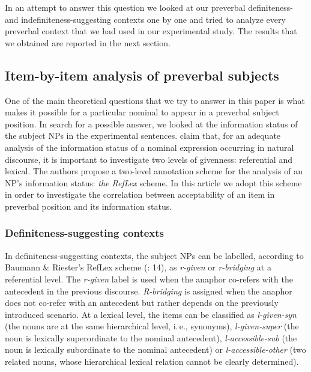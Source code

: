 \documentclass[output=paper]{langsci/langscibook}
\begin{document}
In an attempt to answer this question we looked at our preverbal definite\-ness- and indefiniteness-suggesting contexts one by one and tried to analyze every preverbal context that we had used in our experimental study. The results that we obtained are reported in the next section.

\subsection{Item-by-item analysis of preverbal subjects}\label{2sec:34}

One of the main theoretical questions that we try to answer in this paper is what makes it possible for a particular nominal to appear in a preverbal subject position. In search for a possible answer, we looked at the information status of the subject NPs in the experimental sentences. \cite{baumann:riester:12} claim that, for an adequate analysis of the information status of a nominal expression occurring in natural discourse, it is important to investigate two levels of givenness: referential and lexical. The authors propose a two-level annotation scheme for the analysis of an NP's information status: {\emph{the RefLex}} scheme. In this article we adopt this scheme in order to investigate the correlation between acceptability of an item in preverbal position and its information status.

\subsubsection{Definiteness-suggesting contexts}\label{2sec:341}
\largerpage[2]
In definiteness-suggesting contexts, the subject NPs can be labelled, according to Baumann \& Riester's RefLex scheme (\citeyear{baumann:riester:12}: 14), as {\emph{r-given}} or {\emph{r-bridging}} at a referential level. The {\emph{r-given}} label is used when the anaphor co-refers with the antecedent in the previous discourse. {\emph{R-bridging}} is assigned when the anaphor does not co-refer with an antecedent but rather depends on the previously introduced scenario. At a lexical level, the items can be classified \citep[][18-19]{baumann:riester:12} as {\emph{l-given-syn}} (the nouns are at the same hierarchical level, i.\,e., synonyms), {\emph{l-given-super}} (the noun is lexically superordinate to the nominal antecedent), {\emph{l-accessible-sub}} (the noun is lexically subordinate to the nominal antecedent) or {\emph{l-accessible-other}} (two related nouns, whose hierarchical lexical relation cannot be clearly determined).
\end{document}
